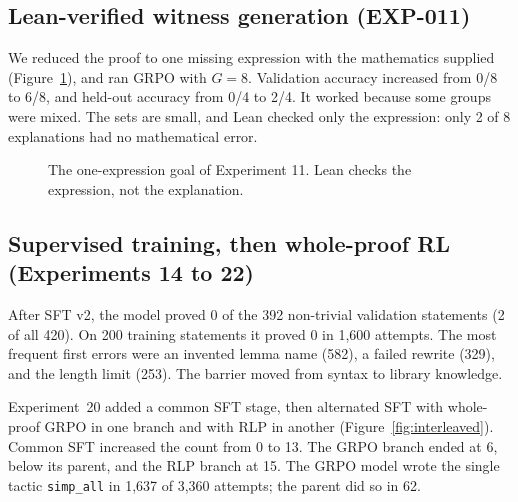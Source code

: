 \documentclass[11pt]{article}
\newcommand{\code}[1]{\texttt{#1}}
\begin{document}
\subsection{Lean-verified witness generation (EXP-011)}
\label{sec:local}
We reduced the proof to one missing expression with the mathematics supplied (Figure~\ref{fig:exp11}), and ran GRPO with $G = 8$.
Validation accuracy increased from 0/8 to 6/8, and held-out accuracy from 0/4 to 2/4.
It worked because some groups were mixed.
The sets are small, and Lean checked only the expression: only 2 of 8 explanations had no mathematical error.

\begin{figure}[!htbp]
\centering
{}
\caption{The one-expression goal of Experiment 11. Lean checks the expression, not the explanation.}
\label{fig:exp11}
\end{figure}

\subsection{Supervised training, then whole-proof RL (Experiments 14 to 22)}
\label{sec:sftrl}
After SFT v2, the model proved 0 of the 392 non-trivial validation statements (2 of all 420).
On 200 training statements it proved 0 in 1,600 attempts.
The most frequent first errors were an invented lemma name (582), a failed rewrite (329), and the length limit (253).
The barrier moved from syntax to library knowledge.

Experiment~20 added a common SFT stage, then alternated SFT with whole-proof GRPO in one branch and with RLP in another (Figure~\ref{fig:interleaved}).
Common SFT increased the count from 0 to 13.
The GRPO branch ended at 6, below its parent, and the RLP branch at 15.
The GRPO model wrote the single tactic \code{simp\_all} in 1,637 of 3,360 attempts; the parent did so in 62.
\end{document}
